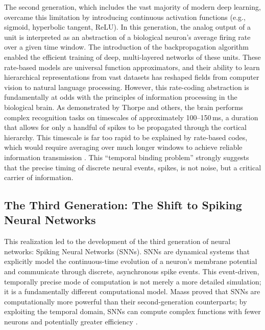 The second generation, which includes the vast majority of modern deep learning, overcame this limitation by introducing continuous activation functions (e.g., sigmoid, hyperbolic tangent, ReLU). In this generation, the analog output of a unit is interpreted as an abstraction of a biological neuron's average firing rate over a given time window. The introduction of the backpropagation algorithm enabled the efficient training of deep, multi-layered networks of these units. These rate-based models are universal function approximators, and their ability to learn hierarchical representations from vast datasets has reshaped fields from computer vision to natural language processing. However, this rate-coding abstraction is fundamentally at odds with the principles of information processing in the biological brain. As demonstrated by Thorpe and others, the brain performs complex recognition tasks on timescales of approximately 100--150\,ms, a duration that allows for only a handful of spikes to be propagated through the cortical hierarchy. This timescale is far too rapid to be explained by rate-based codes, which would require averaging over much longer windows to achieve reliable information transmission \cite{simon_j_thorpe_biological_1989}. This ``temporal binding problem'' strongly suggests that the precise timing of discrete neural events, spikes, is not noise, but a critical carrier of information.

\subsection{The Third Generation: The Shift to Spiking Neural Networks}
This realization led to the development of the third generation of neural networks: Spiking Neural Networks (SNNs). SNNs are dynamical systems that explicitly model the continuous-time evolution of a neuron's membrane potential and communicate through discrete, asynchronous spike events. This event-driven, temporally precise mode of computation is not merely a more detailed simulation; it is a fundamentally different computational model. Maass proved that SNNs are computationally more powerful than their second-generation counterparts; by exploiting the temporal domain, SNNs can compute complex functions with fewer neurons and potentially greater efficiency \cite{maass_networks_1997}.

